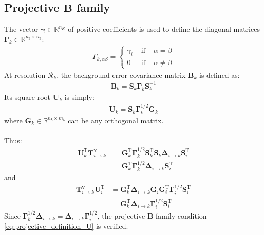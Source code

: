 \documentclass[12pt]{scrartcl}
\begin{document}
\subsection{Projective $\mathbf{B}$ family}
The vector $\boldsymbol{\gamma} \in \mathbb{R}^{n_K}$ of positive coefficients is used to define the diagonal matrices $\boldsymbol{\Gamma}_k \in \mathbb{R}^{n_k \times n_k}$:
\begin{align}
\Gamma_{k,\alpha \beta} = \left\{
\begin{array}{ccc}
\gamma_i & \text{ if } & \alpha = \beta \\
0 & \text{ if } & \alpha \ne \beta
\end{array}\right.
\end{align}
At resolution $\mathcal{R}_k$, the background error covariance matrix $\mathbf{B}_k$ is defined as:
\begin{align}
\mathbf{B}_k = \mathbf{S}_k \boldsymbol{\Gamma}_k \mathbf{S}_k^{-1}
\end{align}
Its square-root $\mathbf{U}_k$ is simply:
\begin{align}
\mathbf{U}_k = \mathbf{S}_k \boldsymbol{\Gamma}_k^{1/2} \mathbf{G}_k
\end{align}
where $\mathbf{G}_k \in \mathbb{R}^{n_k \times m_k}$ can be any orthogonal matrix.\\
$  $\\
Thus:
\begin{align}
\mathbf{U}_k^\mathrm{T} \mathbf{T}^\mathbf{x}_{i \rightarrow k} & = \mathbf{G}^\mathrm{T}_k \boldsymbol{\Gamma}_k^{1/2} \mathbf{S}^\mathrm{T}_k \mathbf{S}_k \boldsymbol{\Delta}_{i \rightarrow k} \mathbf{S}^\mathrm{T}_i \nonumber \\
 & = \mathbf{G}^\mathrm{T}_k \boldsymbol{\Gamma}_k^{1/2}\boldsymbol{\Delta}_{i \rightarrow k} \mathbf{S}^\mathrm{T}_i
\end{align}
and
\begin{align}
\mathbf{T}^\mathbf{v}_{i \rightarrow k} \mathbf{U}_i^\mathrm{T} & = \mathbf{G}^\mathrm{T}_k \boldsymbol{\Delta}_{i \rightarrow k} \mathbf{G}_i \mathbf{G}^\mathrm{T}_i \boldsymbol{\Gamma}_i^{1/2} \mathbf{S}^\mathrm{T}_i \nonumber \\
& = \mathbf{G}^\mathrm{T}_k \boldsymbol{\Delta}_{i \rightarrow k}  \boldsymbol{\Gamma}_i^{1/2} \mathbf{S}^\mathrm{T}_i
\end{align}
Since $\boldsymbol{\Gamma}_k^{1/2}\boldsymbol{\Delta}_{i \rightarrow k} = \boldsymbol{\Delta}_{i \rightarrow k}  \boldsymbol{\Gamma}_i^{1/2}$, the projective $\mathbf{B}$ family condition \eqref{eq:projective_definition_U} is verified.



\end{document}
